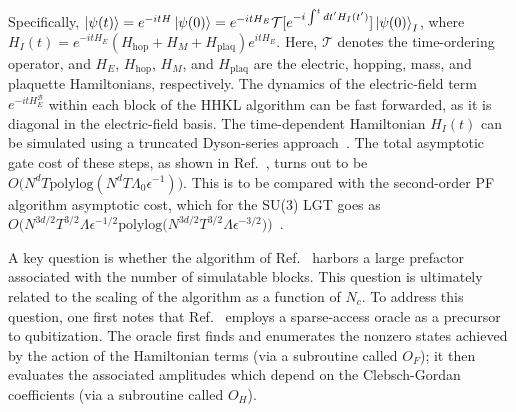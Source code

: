 \documentclass[aps,prd,twocolumn,showpacs,groupedaddress,superscriptaddress,nofootinbib,floatfix,preprintnumbers,longbibliography]{revtex4-1}
\begin{document}
Specifically, $\ket{\psi(t)}=e^{-itH}\ket{\psi(0)}=e^{-itH_E}\mathcal{T}[e^{-i\int^t dt' H_I(t')}]\ket{\psi(0)}_I$, where $H_I(t)=e^{-itH_E}(H_\text{hop}+H_M+H_\text{plaq})e^{itH_E}$. Here, $\mathcal{T}$ denotes the time-ordering operator, and $H_E$, $H_\text{hop}$, $H_M$, and $H_\text{plaq}$ are the electric, hopping, mass, and plaquette Hamiltonians, respectively. The dynamics of the electric-field term $e^{-itH^\mathcal{B}_E}$ within each block of the HHKL algorithm can be fast forwarded, as it is diagonal in the electric-field basis. The time-dependent Hamiltonian $H_I(t)$ can be simulated using a truncated Dyson-series approach~\cite{Berry:2014ivo,Low:2018pte}. The total asymptotic gate cost of these steps, as shown in Ref.~\cite{Rhodes:2024zbr}, turns out to be ${O}\big(N^dT\text{polylog}(N^dT \Lambda_0 \epsilon^{-1})\big)$. This is to be compared with the second-order PF algorithm asymptotic cost, which for the SU(3) LGT goes as $O\big(N^{3d/2}T^{3/2}\Lambda \epsilon^{-1/2}\text{polylog}\big(N^{3d/2}T^{3/2}\Lambda \epsilon^{-3/2} \big)\big)$~\cite{Kan:2021xfc}.

A key question is whether the algorithm of Ref.~\cite{Rhodes:2024zbr} harbors a large prefactor associated with the number of simulatable blocks. This question is ultimately related to the scaling of the algorithm as a function of $N_c$. To address this question, one first notes that Ref.~\cite{Rhodes:2024zbr} employs a sparse-access oracle as a precursor to qubitization. The oracle first finds and enumerates the nonzero states achieved by the action of the Hamiltonian terms (via a subroutine called $O_F$); it then evaluates the associated amplitudes which depend on the Clebsch-Gordan coefficients (via a subroutine called $O_H$). 
\end{document}
